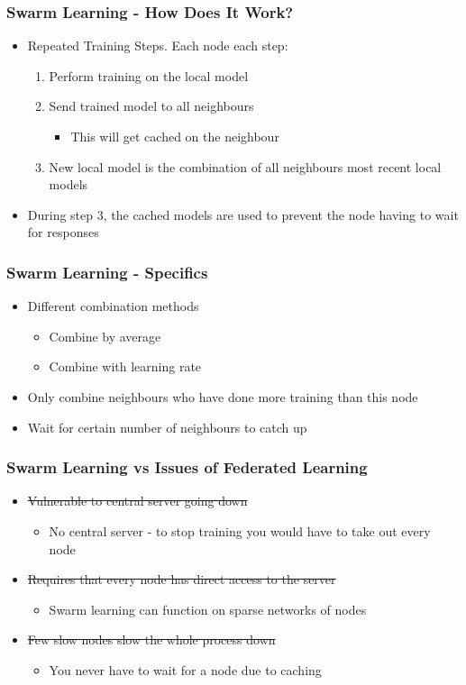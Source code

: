 \documentclass{beamer}
\begin{document}
	\begin{frame}
		\frametitle{Swarm Learning - How Does It Work?}
		\begin{itemize}
			\item Repeated Training Steps. Each node each step:
			\begin{enumerate}
				\item Perform training on the local model
				\item Send trained model to all neighbours
				\begin{itemize}
					\item This will get cached on the neighbour
				\end{itemize}
				\item New local model is the combination of all neighbours most recent local models
			\end{enumerate}
		\item During step 3, the cached models are used to prevent the node having to wait for responses
		\end{itemize}
	\end{frame}

	\begin{frame}
		\frametitle{Swarm Learning - Specifics}
		\begin{itemize}
			\item Different combination methods
			\begin{itemize}
				\item Combine by average
				\item Combine with learning rate
			\end{itemize}
			\item Only combine neighbours who have done more training than this node
			\item Wait for certain number of neighbours to catch up
		\end{itemize}
	\end{frame}

	\begin{frame}
		\frametitle{Swarm Learning vs Issues of Federated Learning}
		\begin{itemize}
			\item \sout{Vulnerable to central server going down}
			\begin{itemize}
				\item No central server - to stop training you would have to take out every node
			\end{itemize}
			\item \sout{Requires that every node has direct access to the server}
			\begin{itemize}
				\item Swarm learning can function on sparse networks of nodes
			\end{itemize}
			\item \sout{Few slow nodes slow the whole process down}
			\begin{itemize}
				\item You never have to wait for a node due to caching
			\end{itemize}
		\end{itemize}
	\end{frame}
\end{document}
